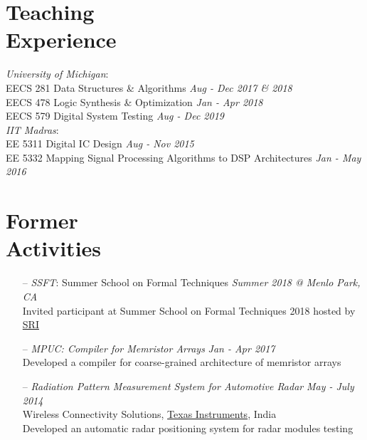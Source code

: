 \documentclass[margin,line,letter]{resume}
\begin{document}
\begin{resume}
\section{\mysidestyle Teaching\\Experience}
    \textit{University of Michigan}: \\
    \phantom{xx}\hspace{3ex} EECS 281 Data Structures \& Algorithms \hfill \emph{Aug - Dec 2017 \& 2018} \\
    \phantom{xx}\hspace{3ex} EECS 478 Logic Synthesis \& Optimization \hfill \emph{Jan - Apr 2018} \\
    \phantom{xx}\hspace{3ex} EECS 579 Digital System Testing \hfill \emph{Aug - Dec 2019} \\
    \textit{IIT Madras}: \\
    \phantom{xx}\hspace{3ex} EE 5311 Digital IC Design \hfill \emph{Aug - Nov 2015} \\
    \phantom{xx}\hspace{3ex} EE 5332 Mapping Signal Processing Algorithms to DSP Architectures \hfill \emph{Jan - May 2016}

\section{\mysidestyle Former \\ Activities}
    \noindent
    \begin{itemize}[leftmargin=*]
    \item[--] \textit{SSFT}: Summer School on Formal Techniques \hfill \emph{Summer 2018 @ Menlo Park, CA} \\
    Invited participant at Summer School on Formal Techniques 2018 hosted by \href{http://csl.sri.com/}{SRI}
    
    \item[--] \textit{MPUC: Compiler for Memristor Arrays} \hfill \emph{Jan - Apr 2017} \\ Developed a compiler for coarse-grained architecture of memristor arrays
    
    \item[--] \textit{Radiation Pattern Measurement System for Automotive Radar} \hfill \emph{May - July 2014} \\
    Wireless Connectivity Solutions, \href{http://www.ti.com/}{Texas Instruments}, India \\
    Developed an automatic radar positioning system for radar modules testing 
    

\end{itemize}
\end{resume}
\end{document}
